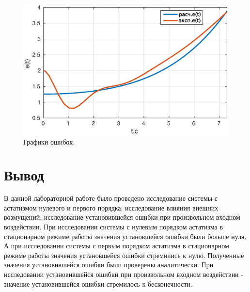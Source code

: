 \documentclass[a4paper,14pt]{article}
\begin{document}
\begin{figure}[H]
\centering
\includegraphics[width=\textwidth]{1/4_2e(t).eps}
\caption{Графики ошибок.}
\end{figure}

\section*{Вывод}
В данной лабораторной работе было проведено исследование системы с астатизмом нулевого и первого порядка; 
исследование влияния внешних возмущений; исследование установившейся ошибки при произвольном входном воздействии.
При исследовании системы с нулевым порядком астатизма в стационарном режиме работы значения установшейся ошибки были больше нуля.
А при исследовании системы с первым порядком астатизма в стационарном режиме работы значения установшейся ошибки стремились к нулю.
Полученные значения установившейся ошибки были проверены аналитически. 
При исследовании установившейся ошибки при произвольном входном воздействии - значение установившейся ошибки стремилось к бесконечности.
\end{document}
